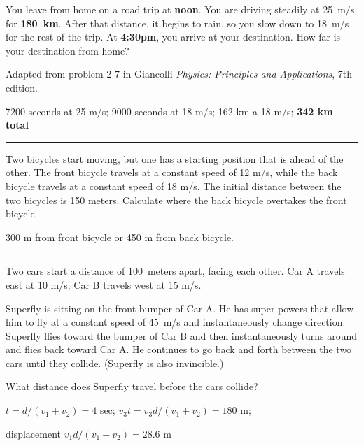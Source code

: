 \documentclass[12pt]{exam}
\begin{document}
\begin{questions}

\Large

\vfill 


\question 
You leave from home on a road trip at \textbf{noon}.  You are driving steadily at 25~m/s for \textbf{180~km}.  After that distance, it begins to rain, so you slow down to 18~m/s for the rest of the trip.  At \textbf{4:30pm}, you arrive at your destination.  How far is your destination from home?

{\small Adapted from problem 2-7 in Giancolli \emph{Physics: Principles and Applications}, 7th edition.}

\begin{solution}
  7200 seconds at 25 m/s; 9000 seconds at 18 m/s; 162 km a 18 m/s; \textbf{342 km total}
\end{solution}

\vfill \hrule \vfill

\question Two bicycles start moving, but one has a starting position that is ahead of the other. The front bicycle travels at a constant speed of 12 m/s, while the back bicycle travels at a constant speed of 18 m/s. The initial distance between the two bicycles is 150 meters.  Calculate where the back bicycle overtakes the front bicycle.

\begin{solution}
  300 m from front bicycle or 450 m from back bicycle.
\end{solution}




\vfill \hrule \vfill

\question
Two cars start a distance of 100~meters apart, facing each other.  Car A travels east at 10 m/s; Car B travels west at 15 m/s.

  \vspace{1em}

  \noindent
  Superfly is sitting on the front bumper of Car A.  He has super powers that allow him to fly at a constant speed of 45~m/s and instantaneously change direction.  Superfly flies toward the bumper of Car B and then instantaneously turns around and flies back toward Car A.  He continues to go back and forth between the two cars until they collide.  (Superfly is also invincible.)

  \vspace{1em}

  \noindent
  What distance does Superfly travel before the cars collide?

  \begin{solution}
    $t=d/(v_1+v_2) = 4$ sec;  $v_3 t = v_3 d/(v_1+v_2) = 180$ m;

    displacement $v_1 d/(v_1+v_2) = 28.6$ m
  \end{solution}


\end{questions}
\end{document}
